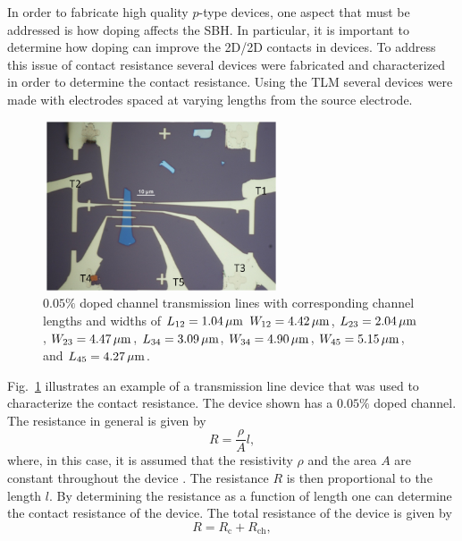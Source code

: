 \noindent In order to fabricate high quality $p$-type  devices, one aspect that must be addressed is how doping affects the \ac{SBH}. In particular, it is important to determine how doping can improve the 2D/2D contacts in devices. To address this issue of contact resistance several devices were fabricated and characterized in order to determine the contact resistance. Using the \ac{TLM} several  devices were made with electrodes spaced at varying lengths from the source electrode. 
\begin{figure}[ht]
	\centering
	\includegraphics[height=5cm,width=7cm]{figs/results/transmission_line/transmission_device_pic_5-5_21_10232015_no1}
	\caption[Transmission line $0.05\%$  doped  channel device]{$0.05\%$  doped  channel transmission lines with corresponding channel lengths and widths of $L_{12} = 1.04\,\mathrm{\mu m}$ $W_{12} = 4.42\,\mathrm{\mu m}$, $L_{23} = 2.04\,\mathrm{\mu m}$, $W_{23} = 4.47\,\mathrm{\mu m}$, $L_{34} = 3.09\,\mathrm{\mu m}$, $W_{34} = 4.90\,\mathrm{\mu m}$, $W_{45} = 5.15\,\mathrm{\mu m}$, and $L_{45} = 4.27\,\mathrm{\mu m}$.}
	\label{fig:transmission_device_10232015_no1}
\end{figure}
Fig.~\ref{fig:transmission_device_10232015_no1} illustrates an example of a transmission line device that was used to characterize the contact resistance. The device shown has a $0.05\%$  doped  channel. The resistance in general is given by
\begin{equation}\label{eq:resistance_formula}
	R = \frac{\rho}{A} l,
\end{equation}
where, in this case, it is assumed that the resistivity $\rho$ and the area $A$ are constant throughout the device \cite{Schroder_Semiconductor2006}. The resistance $R$ is then proportional to the length $l$. By determining the resistance as a function of length one can determine the contact resistance of the device. The total resistance of the device is given by
\begin{equation}\label{eq:resistance_total}
	R = R_\mathrm{c} + R_\mathrm{ch},
\end{equation}
